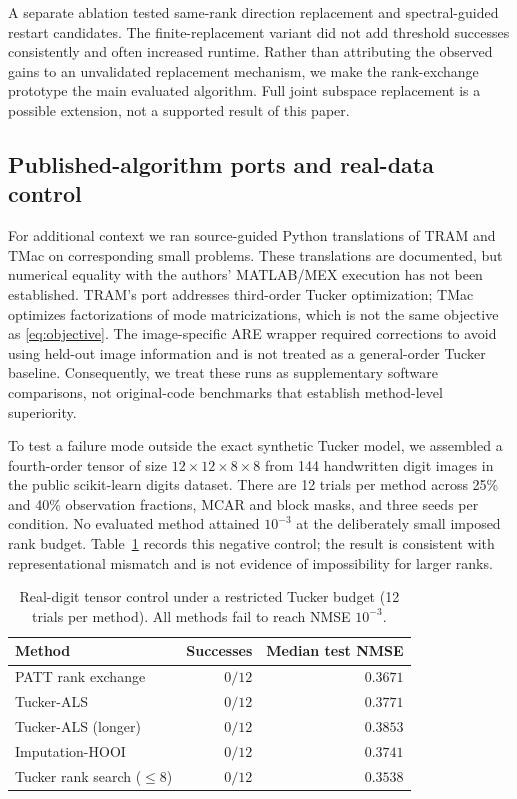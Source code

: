 \documentclass[review,10pt]{elsarticle}
\begin{document}
A separate ablation tested same-rank direction replacement and spectral-guided restart candidates. The finite-replacement variant did not add threshold successes consistently and often increased runtime. Rather than attributing the observed gains to an unvalidated replacement mechanism, we make the rank-exchange prototype the main evaluated algorithm. Full joint subspace replacement is a possible extension, not a supported result of this paper.

\subsection{Published-algorithm ports and real-data control}\label{subsec:supplement}
For additional context we ran source-guided Python translations of TRAM \cite{GaoPengYuan2025} and TMac \cite{XuHaoYinSu2015} on corresponding small problems. These translations are documented, but numerical equality with the authors' MATLAB/MEX execution has not been established. TRAM's port addresses third-order Tucker optimization; TMac optimizes factorizations of mode matricizations, which is not the same objective as \eqref{eq:objective}. The image-specific ARE wrapper \cite{MiHeLiLiu2026} required corrections to avoid using held-out image information and is not treated as a general-order Tucker baseline. Consequently, we treat these runs as supplementary software comparisons, not original-code benchmarks that establish method-level superiority.

To test a failure mode outside the exact synthetic Tucker model, we assembled a fourth-order tensor of size $12\times12\times8\times8$ from 144 handwritten digit images in the public scikit-learn digits dataset. There are 12 trials per method across 25\% and 40\% observation fractions, MCAR and block masks, and three seeds per condition. No evaluated method attained $10^{-3}$ at the deliberately small imposed rank budget. Table~\ref{tab:digits} records this negative control; the result is consistent with representational mismatch and is not evidence of impossibility for larger ranks.

\begin{table}[tbp]
\caption{Real-digit tensor control under a restricted Tucker budget (12 trials per method). All methods fail to reach NMSE $10^{-3}$.}\label{tab:digits}
\centering\small
\begin{tabular}{lrr}
\toprule
Method & Successes & Median test NMSE\\
\midrule
PATT rank exchange & $0/12$ & $0.3671$\\
Tucker-ALS & $0/12$ & $0.3771$\\
Tucker-ALS (longer) & $0/12$ & $0.3853$\\
Imputation-HOOI & $0/12$ & $0.3741$\\
Tucker rank search ($\le8$) & $0/12$ & $0.3538$\\
\bottomrule
\end{tabular}
\end{table}
\end{document}
